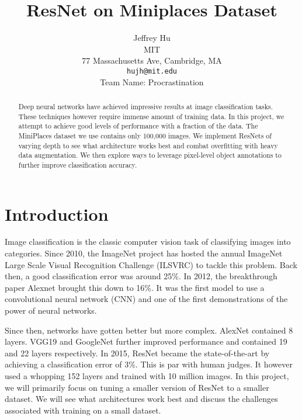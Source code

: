 \documentclass[10pt,twocolumn,letterpaper]{article}
\begin{document}
\title{ResNet on Miniplaces Dataset}

\author{Jeffrey Hu\\
MIT\\
77 Massachusetts Ave, Cambridge, MA\\
{\tt\small hujh@mit.edu}\\
Team Name: Procrastination
}

\maketitle

\begin{abstract}
   Deep neural networks have achieved impressive results at image classification tasks. These techniques however require immense amount of training data. In this project, we attempt to achieve good levels of performance with a fraction of the data. The MiniPlaces dataset we use contains only 100,000 images. We implement ResNets of varying depth to see what architecture works best and combat overfitting with heavy data augmentation. We then explore ways to leverage pixel-level object annotations to further improve classification accuracy.
\end{abstract}

\section{Introduction}

Image classification is the classic computer vision task of classifying images into categories. Since 2010, the ImageNet project has hosted the annual ImageNet Large Scale Visual Recognition Challenge (ILSVRC) to tackle this problem. Back then, a good classification error was around 25\%. In 2012, the breakthrough paper Alexnet\cite{alexnet} brought this down to 16\%. It was the first model to use a convolutional neural network (CNN) and one of the first demonstrations of the power of neural networks.

Since then, networks have gotten better but more complex. AlexNet contained 8 layers. VGG19\cite{vgg} and GoogleNet\cite{google} further improved performance and contained 19 and 22 layers respectively. In 2015, ResNet\cite{resnet} became the state-of-the-art by achieving a classification error of 3\%. This is par with human judges. It however used a whopping 152 layers and trained with 10 million images. In this project, we will primarily focus on tuning a smaller version of ResNet to a smaller dataset. We will see what architectures work best and discuss the challenges associated with training on a small dataset.
\end{document}
